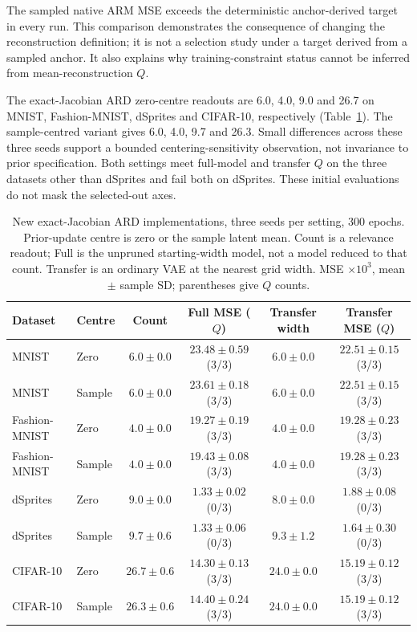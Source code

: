 \documentclass[make,article,submit,pdftex,moreauthors]{Definitions/mdpi}
\begin{document}
The sampled native ARM MSE exceeds the deterministic anchor-derived
target in every run. This comparison demonstrates the consequence of
changing the reconstruction definition; it is not a selection study
under a target derived from a sampled anchor. It also explains why
training-constraint status cannot be inferred from mean-reconstruction $Q$.

The exact-Jacobian ARD zero-centre readouts are 6.0, 4.0, 9.0 and 26.7
on MNIST, Fashion-MNIST, dSprites and CIFAR-10, respectively
(Table~\ref{tab:ardnew}). The sample-centred variant gives 6.0, 4.0, 9.7
and 26.3. Small differences across these three seeds support a bounded
centering-sensitivity observation, not invariance to prior specification.
Both settings meet full-model and transfer $Q$ on the three datasets
other than dSprites and fail both on dSprites. These initial evaluations
do not mask the selected-out axes.
\begin{table}[H]
\caption{New exact-Jacobian ARD implementations, three seeds per setting, 300 epochs. Prior-update centre is zero or the sample latent mean. Count is a relevance readout; Full is the unpruned starting-width model, not a model reduced to that count. Transfer is an ordinary VAE at the nearest grid width. MSE $\times10^3$, mean $\pm$ sample SD; parentheses give $Q$ counts.}\label{tab:ardnew}
\footnotesize
\setlength{\tabcolsep}{3pt}
\begin{tabular*}{\textwidth}{@{\extracolsep{\fill}}llcccc@{}}
\toprule
Dataset & Centre & Count & Full MSE ($Q$) & Transfer width & Transfer MSE ($Q$) \\
\midrule
MNIST & Zero & $6.0 \pm 0.0$ & $23.48 \pm 0.59$ (3/3) & $6.0 \pm 0.0$ & $22.51 \pm 0.15$ (3/3) \\
MNIST & Sample & $6.0 \pm 0.0$ & $23.61 \pm 0.18$ (3/3) & $6.0 \pm 0.0$ & $22.51 \pm 0.15$ (3/3) \\
Fashion-MNIST & Zero & $4.0 \pm 0.0$ & $19.27 \pm 0.19$ (3/3) & $4.0 \pm 0.0$ & $19.28 \pm 0.23$ (3/3) \\
Fashion-MNIST & Sample & $4.0 \pm 0.0$ & $19.43 \pm 0.08$ (3/3) & $4.0 \pm 0.0$ & $19.28 \pm 0.23$ (3/3) \\
dSprites & Zero & $9.0 \pm 0.0$ & $1.33 \pm 0.02$ (0/3) & $8.0 \pm 0.0$ & $1.88 \pm 0.08$ (0/3) \\
dSprites & Sample & $9.7 \pm 0.6$ & $1.33 \pm 0.06$ (0/3) & $9.3 \pm 1.2$ & $1.64 \pm 0.30$ (0/3) \\
CIFAR-10 & Zero & $26.7 \pm 0.6$ & $14.30 \pm 0.13$ (3/3) & $24.0 \pm 0.0$ & $15.19 \pm 0.12$ (3/3) \\
CIFAR-10 & Sample & $26.3 \pm 0.6$ & $14.40 \pm 0.24$ (3/3) & $24.0 \pm 0.0$ & $15.19 \pm 0.12$ (3/3) \\
\bottomrule\end{tabular*}
\end{table}
\end{document}
